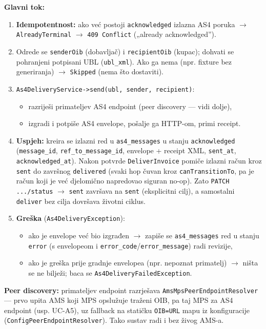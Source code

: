 \documentclass[11pt,a4paper]{article}
\begin{document}
\textbf{Glavni tok:}
\begin{enumerate}[nosep]
  \item \textbf{Idempotentnost:} ako već postoji \texttt{acknowledged} izlazna AS4 poruka $\rightarrow$
        \texttt{AlreadyTerminal} $\rightarrow$ \texttt{409 Conflict} („already acknowledged”).
  \item Odrede se \texttt{senderOib} (dobavljač) i \texttt{recipientOib} (kupac); dohvati se pohranjeni
        potpisani UBL (\texttt{ubl\_xml}). Ako ga nema (npr. fixture bez generiranja) $\rightarrow$
        \texttt{Skipped} (nema što dostaviti).
  \item \texttt{As4DeliveryService->send(ubl, sender, recipient)}:
    \begin{itemize}[nosep]
      \item razriješi primateljev AS4 endpoint (peer discovery — vidi dolje),
      \item izgradi i potpiše AS4 envelope, pošalje ga HTTP-om, primi receipt.
    \end{itemize}
  \item \textbf{Uspjeh:} kreira se izlazni red u \texttt{as4\_messages} u stanju \texttt{acknowledged}
        (\texttt{message\_id}, \texttt{ref\_to\_message\_id}, envelope + receipt XML, \texttt{sent\_at}, \texttt{acknowledged\_at}).
        Nakon potvrde \texttt{DeliverInvoice} pomiče izlazni račun kroz \texttt{sent} do završnog
        \texttt{delivered} (svaki hop čuvan kroz \texttt{canTransitionTo}, pa je račun koji je već
        djelomično napredovao siguran no-op). Zato \texttt{PATCH .../status} $\rightarrow$ \texttt{sent} završava
        na \texttt{sent} (eksplicitni cilj), a samostalni \texttt{deliver} bez cilja dovršava životni ciklus.
  \item \textbf{Greška} (\texttt{As4DeliveryException}):
    \begin{itemize}[nosep]
      \item ako je envelope već bio izgrađen $\rightarrow$ zapiše se \texttt{as4\_messages} red u stanju \texttt{error}
            (s envelopeom i \texttt{error\_code}/\texttt{error\_message}) radi revizije,
      \item ako je greška prije gradnje envelopea (npr. nepoznat primatelj) $\rightarrow$ ništa se ne
            bilježi; baca se \texttt{As4DeliveryFailedException}.
    \end{itemize}
\end{enumerate}

\textbf{Peer discovery:} primateljev endpoint razrješava \texttt{AmsMpsPeerEndpointResolver} —
prvo upita AMS koji MPS opslužuje traženi OIB, pa taj MPS za AS4 endpoint
(usp. UC-A5), uz fallback na statičku \texttt{OIB=URL} mapu iz konfiguracije
(\texttt{ConfigPeerEndpointResolver}). Tako sustav radi i bez živog AMS-a.
\end{document}

